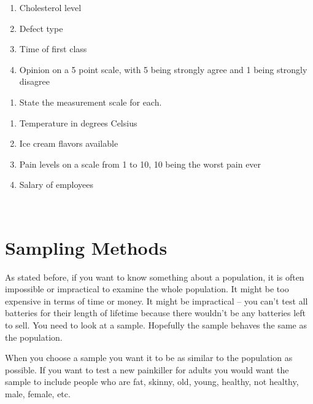 \documentclass[]{book}
\providecommand{\tightlist}{%
  \setlength{\itemsep}{0pt}\setlength{\parskip}{0pt}}
\begin{document}
\begin{enumerate}
\def\labelenumi{\alph{enumi}.}
\tightlist
\item
  Cholesterol level
\item
  Defect type
\item
  Time of first class
\item
  Opinion on a 5 point scale, with 5 being strongly agree and 1 being
  strongly disagree
\end{enumerate}

\begin{enumerate}
\def\labelenumi{\arabic{enumi}.}
\setcounter{enumi}{9}
\tightlist
\item
  State the measurement scale for each.
\end{enumerate}

\begin{enumerate}
\def\labelenumi{\alph{enumi}.}
\tightlist
\item
  Temperature in degrees Celsius
\item
  Ice cream flavors available
\item
  Pain levels on a scale from 1 to 10, 10 being the worst pain ever
\item
  Salary of employees
\end{enumerate}

\textbf{\\
}

\hypertarget{sampling-methods}{%
\section{Sampling Methods}\label{sampling-methods}}

As stated before, if you want to know something about a population, it is often impossible or impractical to examine the whole population. It might be too expensive in terms of time or money. It might be impractical -- you can't test all batteries for their length of lifetime because there wouldn't be any batteries left to sell. You need to look at a sample. Hopefully the sample behaves the same as the population.

When you choose a sample you want it to be as similar to the population as possible. If you want to test a new painkiller for adults you would want the sample to include people who are fat, skinny, old, young, healthy, not healthy, male, female, etc.
\end{document}
